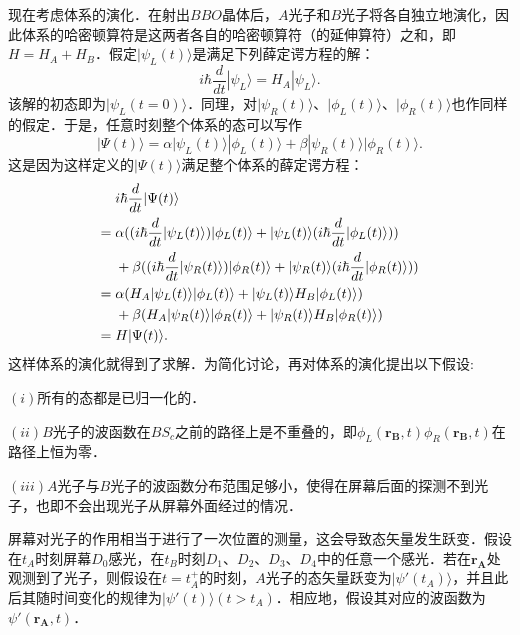 现在考虑体系的演化．在射出$BBO$晶体后，$A$光子和$B$光子将各自独立地演化，因此体系的哈密顿算符是这两者各自的哈密顿算符（的延伸算符）之和，即$H=H_A+H_B$．假定$|\psi_L(t)\rangle$是满足下列薛定谔方程的解：
\begin{equation}
i\hbar\frac{d}{dt}|\psi_L\rangle =H_A|\psi_L\rangle.
\end{equation}
该解的初态即为$|\psi_L(t=0)\rangle$．同理，对$|\psi_R(t)\rangle$、$|\phi_L(t)\rangle$、$|\phi_R(t)\rangle$也作同样的假定．于是，任意时刻整个体系的态可以写作
\begin{equation}
|\Psi(t)\rangle =\alpha|\psi_L(t)\rangle|\phi_L(t)\rangle+\beta|\psi_R(t)\rangle|\phi_R(t)\rangle.
\end{equation}
这是因为这样定义的$|\Psi(t)\rangle$满足整个体系的薛定谔方程：
\begin{align}
&i\hbar\frac{d}{dt}|\Psi(t)\rangle \notag \\
={}&\alpha((i\hbar\frac{d}{dt}|\psi_L(t)\rangle)|\phi_L(t)\rangle+|\psi_L(t)\rangle(i\hbar\frac{d}{dt}|\phi_L(t)\rangle)) \notag \\
&+\beta((i\hbar\frac{d}{dt}|\psi_R(t)\rangle)|\phi_R(t)\rangle+|\psi_R(t)\rangle(i\hbar\frac{d}{dt}|\phi_R(t)\rangle)) \notag \\
={}&\alpha(H_A|\psi_L(t)\rangle|\phi_L(t)\rangle+|\psi_L(t)\rangle H_B|\phi_L(t)\rangle) \notag \\
&+\beta(H_A|\psi_R(t)\rangle|\phi_R(t)\rangle+|\psi_R(t)\rangle H_B|\phi_R(t)\rangle) \notag \\
={}&H|\Psi(t)\rangle.
\end{align}
这样体系的演化就得到了求解．为简化讨论，再对体系的演化提出以下假设:

$(i)$所有的态都是已归一化的．

$(ii)$$B$光子的波函数在$BS_c$之前的路径上是不重叠的，即$\phi_L(\boldsymbol{r_B},t)\phi_R(\boldsymbol{r_B},t)$在路径上恒为零．

$(iii)$$A$光子与$B$光子的波函数分布范围足够小，使得在屏幕后面的探测不到光子，也即不会出现光子从屏幕外面经过的情况．


屏幕对光子的作用相当于进行了一次位置的测量，这会导致态矢量发生跃变．假设在$t_A$时刻屏幕$D_0$感光，在$t_B$时刻$D_1$、$D_2$、$D_3$、$D_4$中的任意一个感光．若在$\boldsymbol{r_A}$处观测到了光子，则假设在$t=t_A^+$的时刻，$A$光子的态矢量跃变为$|\psi'(t_A)\rangle$，并且此后其随时间变化的规律为$|\psi'(t)\rangle(t>t_A)$．相应地，假设其对应的波函数为$\psi'(\boldsymbol{r_A},t)$．

